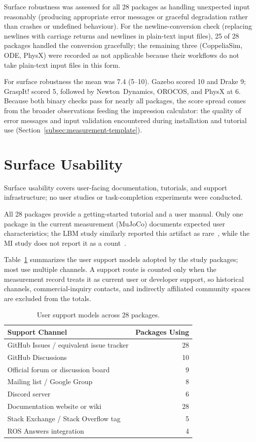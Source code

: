 Surface robustness was assessed for all 28 packages as handling unexpected input reasonably (producing appropriate error messages or graceful degradation rather than crashes or undefined behaviour). For the newline-conversion check (replacing newlines with carriage returns and newlines in plain-text input files), 25 of 28 packages handled the conversion gracefully; the remaining three (CoppeliaSim, ODE, PhysX) were recorded as not applicable because their workflows do not take plain-text input files in this form.

For surface robustness the mean was 7.4 (5--10). Gazebo scored 10 and Drake 9; GraspIt! scored 5, followed by Newton~Dynamics, OROCOS, and PhysX at 6. Because both binary checks pass for nearly all packages, the score spread comes from the broader observations feeding the impression calculator: the quality of error messages and input validation encountered during installation and tutorial use (Section~\ref{subsec:measurement-template}).

\section{Surface Usability}
\label{sec:surface-usability-results}

Surface usability covers user-facing documentation, tutorials, and support infrastructure; no user studies or task-completion experiments were conducted.

All 28 packages provide a getting-started tutorial and a user manual. Only one package in the current measurement (MuJoCo) documents expected user characteristics; the LBM study similarly reported this artifact as rare~\citep{Smith2024LBM}, while the MI study does not report it as a count~\citep{Smith2024MI}.

Table~\ref{tab:support-models} summarizes the user support models adopted by the study packages; most use multiple channels. A support route is counted only when the measurement record treats it as current user or developer support, so historical channels, commercial-inquiry contacts, and indirectly affiliated community spaces are excluded from the totals.

\begin{table}[H]
\centering
\caption{User support models across 28 packages.}
\label{tab:support-models}
\begin{tabular}{@{}lr@{}}
\toprule
\textbf{Support Channel} & \textbf{Packages Using} \\
\midrule
GitHub Issues / equivalent issue tracker & 28 \\
GitHub Discussions & 10 \\
Official forum or discussion board & 9 \\
Mailing list / Google Group & 8 \\
Discord server & 6 \\
Documentation website or wiki & 28 \\
Stack Exchange / Stack Overflow tag & 5 \\
ROS Answers integration & 4 \\
\bottomrule
\end{tabular}
\end{table}

